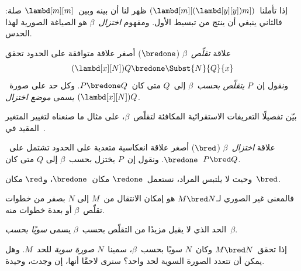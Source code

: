 \documentclass[../../../include/open-logic-section]{subfiles}
\begin{document}

إذا تأملنا~$(\lambd[m][(\lambd[y][y]) m])$ ظهر لنا أن بينه وبين~$\lambd[m][m]$ صلة:
فالثاني ينبغي أن ينتج من تبسيط الأول.
ومفهوم \emph{اختزال~$\beta$} هو الصياغة الصورية لهذا الحدس.

\begin{defn} 
  علاقة \emph{تقلّص~$\beta$} ($\bredone$) أصغر علاقة متوافقة على الحدود تحقق
  \[
    (\lambd[x][N])Q \bredone \Subst{N}{Q}{x} 
  \]
  ونقول إن~$P$ \emph{يتقلّص بحسب~$\beta$} إلى~$Q$ متى كان~$P \bredone
  Q$.
  وكل حد على صورة~$(\lambd[x][N])Q$ يسمى \emph{موضع اختزال}.
\end{defn}

\begin{prob} 
  بيّن تفصيلًا التعريفات الاستقرائية المكافئة لتقلّص~$\beta$،
  على مثال ما صنعناه لتغيير المتغير المقيد في~.
\end{prob}
  
\begin{defn} 
  علاقة \emph{اختزال~$\beta$} ($\bred$) أصغر علاقة انعكاسية متعدية على الحدود
  تشتمل على~$\bredone$. ونقول إن~$P$ يختزل بحسب~$\beta$ إلى
  $Q$ متى كان~$P \bred Q$.
\end{defn}

وحيث لا يلتبس المراد، نستعمل~$\redone$ مكان~$\bredone$،
و$\red$ مكان~$\bred$.

فالمعنى غير الصوري لـ$M \bred N$ هو إمكان الانتقال من~$M$ إلى
$N$ بصفر من خطوات تقلّص~$\beta$ أو بعدة خطوات منه.

\begin{defn}
الحد الذي لا يقبل مزيدًا من التقلّص بحسب~$\beta$ يسمى \emph{سويًا بحسب~$\beta$}.
\end{defn}

إذا تحقق~$M \bred N$ وكان~$N$ سويًا بحسب~$\beta$، سمينا~$N$
\emph{صورة سوية} للحد~$M$. وهل يمكن أن تتعدد الصورة السوية لحد واحد؟
سنرى لاحقًا أنها، إن وجدت، وحيدة.
\end{document}
